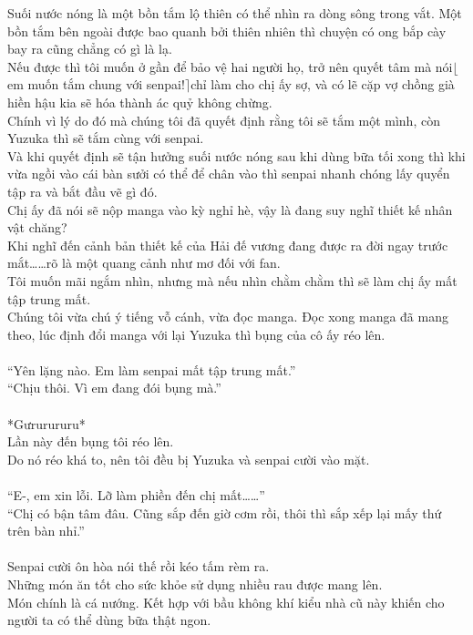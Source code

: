 \documentclass[12pt,a4paper, twosides]{book}
\begin{document}
Suối nước nóng là một bồn tắm lộ thiên có thể nhìn ra dòng sông trong vắt. Một bồn tắm bên ngoài được bao quanh bởi thiên nhiên thì chuyện có ong bắp cày bay ra cũng chẳng có gì là lạ.\\
Nếu được thì tôi muốn ở gần để bảo vệ hai người họ, trở nên quyết tâm mà nói$\lfloor$em muốn tắm chung với senpai!$\rceil$chỉ làm cho chị ấy sợ, và có lẽ cặp vợ chồng già hiền hậu kia sẽ hóa thành ác quỷ không chừng.\\
Chính vì lý do đó mà chúng tôi đã quyết định rằng tôi sẽ tắm một mình, còn Yuzuka thì sẽ tắm cùng với senpai.\\
Và khi quyết định sẽ tận hưởng suối nước nóng sau khi dùng bữa tối xong thì khi vừa ngồi vào cái bàn sưởi có thể để chân vào thì senpai nhanh chóng lấy quyển tập ra và bắt đầu vẽ gì đó.\\
Chị ấy đã nói sẽ nộp manga vào kỳ nghỉ hè, vậy là đang suy nghĩ thiết kế nhân vật chăng?\\
Khi nghĩ đến cảnh bản thiết kế của Hải đế vương đang được ra đời ngay trước mắt……rõ là một quang cảnh như mơ đối với fan.\\
Tôi muốn mãi ngắm nhìn, nhưng mà nếu nhìn chằm chằm thì sẽ làm chị ấy mất tập trung mất.\\
Chúng tôi vừa chú ý tiếng vỗ cánh, vừa đọc manga. Đọc xong manga đã mang theo, lúc định đổi manga với lại Yuzuka thì bụng của cô ấy réo lên.\\
\\
“Yên lặng nào. Em làm senpai mất tập trung mất.”\\
“Chịu thôi. Vì em đang đói bụng mà.”\\
\\
*Gưrurururu*\\
Lần này đến bụng tôi réo lên.\\
Do nó réo khá to, nên tôi đều bị Yuzuka và senpai cười vào mặt.\\
\\
“E-, em xin lỗi. Lỡ làm phiền đến chị mất……”\\
“Chị có bận tâm đâu. Cũng sắp đến giờ cơm rồi, thôi thì sắp xếp lại mấy thứ trên bàn nhỉ.”\\
\\
Senpai cười ôn hòa nói thế rồi kéo tấm rèm ra.\\
Những món ăn tốt cho sức khỏe sử dụng nhiều rau được mang lên.\\
Món chính là cá nướng. Kết hợp với bầu không khí kiểu nhà cũ này khiến cho người ta có thể dùng bữa thật ngon.\\
\end{document}
